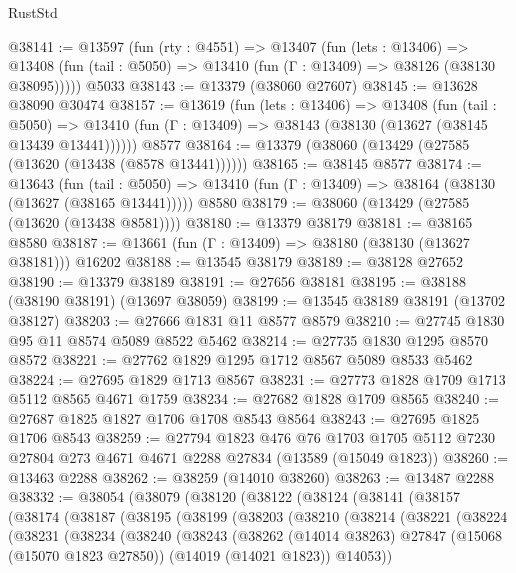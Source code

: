 \begin{lexlean}{RustStd}
\begin{coremodule}
@38141 := @13597
    (fun (rty : @4551) =>
    @13407
      (fun (lets : @13406) =>
      @13408 (fun (tail : @5050) => @13410 (fun (Γ : @13409) => @38126 (@38130 @38095)))))
    @5033
@38143 := @13379 (@38060 @27607)
@38145 := @13628 @38090 @30474
@38157 := @13619
    (fun (lets : @13406) =>
    @13408
      (fun (tail : @5050) =>
      @13410 (fun (Γ : @13409) => @38143 (@38130 (@13627 (@38145 @13439 @13441))))))
    @8577
@38164 := @13379 (@38060 (@13429 (@27585 (@13620 (@13438 (@8578 @13441))))))
@38165 := @38145 @8577
@38174 := @13643
    (fun (tail : @5050) => @13410 (fun (Γ : @13409) => @38164 (@38130 (@13627 (@38165 @13441)))))
    @8580
@38179 := @38060 (@13429 (@27585 (@13620 (@13438 @8581))))
@38180 := @13379 @38179
@38181 := @38165 @8580
@38187 := @13661 (fun (Γ : @13409) => @38180 (@38130 (@13627 @38181))) @16202
@38188 := @13545 @38179
@38189 := @38128 @27652
@38190 := @13379 @38189
@38191 := @27656 @38181
@38195 := @38188 (@38190 @38191) (@13697 @38059)
@38199 := @13545 @38189 @38191 (@13702 @38127)
@38203 := @27666 @1831 @11 @8577 @8579
@38210 := @27745 @1830 @95 @11 @8574 @5089 @8522 @5462
@38214 := @27735 @1830 @1295 @8570 @8572
@38221 := @27762 @1829 @1295 @1712 @8567 @5089 @8533 @5462
@38224 := @27695 @1829 @1713 @8567
@38231 := @27773 @1828 @1709 @1713 @5112 @8565 @4671 @1759
@38234 := @27682 @1828 @1709 @8565
@38240 := @27687 @1825 @1827 @1706 @1708 @8543 @8564
@38243 := @27695 @1825 @1706 @8543
@38259 := @27794
    @1823
    @476
    @76
    @1703
    @1705
    @5112
    @7230
    @27804
    @273
    @4671
    @4671
    @2288
    @27834
    (@13589 (@15049 @1823))
@38260 := @13463 @2288
@38262 := @38259 (@14010 @38260)
@38263 := @13487 @2288
@38332 := @38054
    (@38079
      (@38120
        (@38122
          (@38124
            (@38141
              (@38157
                (@38174
                  (@38187
                    (@38195
                      (@38199
                        (@38203
                          (@38210
                            (@38214
                              (@38221
                                (@38224
                                  (@38231
                                    (@38234
                                      (@38240
                                        (@38243
                                          (@38262
                                            (@14014 @38263)
                                            @27847
                                            (@15068 (@15070 @1823 @27850))
                                            (@14019 (@14021 @1823))
                                            @14053))

\end{coremodule}
\end{lexlean}
